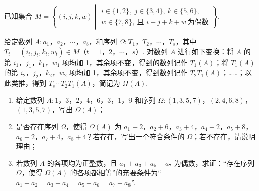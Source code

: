 \begin{problem}
已知集合 \(M=\left\{(i,j,k,w)\middle|\begin{gathered}i\in\{1,2\},\ j\in\{3,4\},\ k\in\{5,6\},\\ w\in\{7,8\},\ \text{且 }i+j+k+w\ \text{为偶数}\end{gathered}\right\}\).

给定数列 \(A:a_1\)，\(a_2\)，\(\cdots\)，\(a_8\)，和序列 \(\Omega:T_1\)，\(T_2\)，\(\cdots\)，\(T_s\)，其中 \(T_t=(i_t,j_t,k_t,w_t)\in M\)（\(t=1\)，\(2\)，\(\cdots\)，\(s\)）. 对数列 \(A\) 进行如下变换：将 \(A\) 的第 \(i_1\)，\(j_1\)，\(k_1\)，\(w_1\) 项均加 1，其余项不变，得到的数列记作 \(T_1(A)\)；将 \(T_1(A)\) 的第 \(i_2\)，\(j_2\)，\(k_2\)，\(w_2\) 项均加 1，其余项不变，得到数列记作 \(T_2T_1(A)\)；……；以此类推，得到 \(T_s\cdots T_2T_1(A)\)，简记为 \(\Omega(A)\).

\begin{enumerate}
\item 给定数列 \(A:1\)，\(3\)，\(2\)，\(4\)，\(6\)，\(3\)，\(1\)，\(9\) 和序列 \(\Omega:(1,3,5,7)\)，\((2,4,6,8)\)，\((1,3,5,7)\)，写出 \(\Omega(A)\)；
\item 是否存在序列 \(\Omega\)，使得 \(\Omega(A)\) 为 \(a_1+2\)，\(a_2+6\)，\(a_3+4\)，\(a_4+2\)，\(a_5+8\)，\(a_6+2\)，\(a_7+4\)，\(a_8+4\)？若存在，写出一个符合条件的 \(\Omega\)；若不存在，请说明理由；
\item 若数列 \(A\) 的各项均为正整数，且 \(a_1+a_3+a_5+a_7\) 为偶数，求证：“存在序列 \(\Omega\)，使得 \(\Omega(A)\) 的各项都相等”的充要条件为“\(a_1+a_2=a_3+a_4=a_5+a_6=a_7+a_8\)”.
\end{enumerate}
\end{problem}

